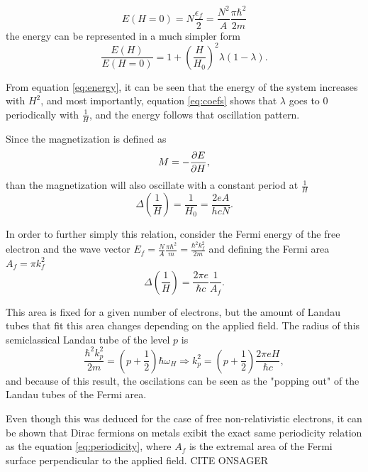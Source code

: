 \documentclass[prd,amsfonts,onecolumn,superscriptaddress,aps,nofootinbib,11pt]{revtex4}
\begin{document}
\begin{equation}\label{eq:E(H=0)}
    E(H=0) = N\frac{\epsilon_f}{2} = \frac{N^2}{A} \frac{\pi \hbar^2}{2 m} 
\end{equation}
the energy can be represented in a much simpler form
\begin{equation}\label{eq:energy}
    \frac{E(H)}{E(H=0)} = 1 + \left( \frac{H}{H_0} \right)^2 \lambda(1-\lambda) .
\end{equation}

From equation \ref{eq:energy}, it can be seen that the energy of the system increases with $H^2$, and most importantly, equation \ref{eq:coefs} shows that $\lambda$ goes to 0 periodically with $\frac{1}{H}$, and the energy follows that oscillation pattern.

Since the magnetization is defined as
\begin{equation}
    M = - \pdv{E}{H},
\end{equation}
than the magnetization will also oscillate with a constant period at $\frac{1}{H}$
\begin{equation}
    \Delta\left( \frac{1}{H} \right) = \frac{1}{H_0} = \frac{2 e A}{h c N}.
\end{equation}

In order to further simply this relation, consider the Fermi energy of the free electron and the wave vector  $E_f = \frac{N}{A}\frac{\pi \hbar^2}{m} = \frac{\hbar^2 k_f^2}{2m}$ and defining the Fermi area $A_f = \pi k_f^2$
\begin{equation}
    \Delta\left( \frac{1}{H} \right) = \frac{2 \pi e}{\hbar c} \frac{1}{A_f}.
\end{equation}


This area is fixed for a given number of electrons, but the amount of Landau tubes that fit this area changes depending on the applied field. The radius of this semiclassical Landau tube of the level $p$ is 
\begin{equation}\label{eq:periodicity}
    \frac{\hbar^2 k_p^2}{2m} = (p + \frac{1}{2})\hbar \omega_H \Rightarrow k_p^2 = (p + \frac{1}{2}) \frac{2 \pi e H}{\hbar c},
\end{equation}
and because of this result, the oscilations can be seen as the "popping out" of the Landau tubes of the Fermi area.

Even though this was deduced for the case of free non-relativistic electrons, it can be shown that Dirac fermions on metals exibit the exact same periodicity  relation as the equation \ref{eq:periodicity}, where $A_f$ is the extremal area of the Fermi surface perpendicular to the applied field. CITE ONSAGER 
\end{document}
